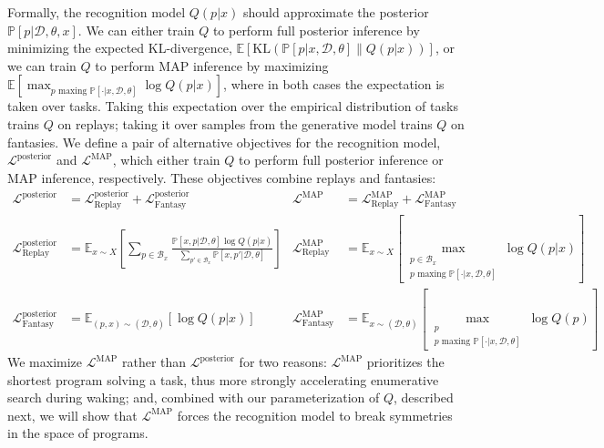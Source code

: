 \documentclass{article}
\newcommand{\expect}{\mathds{E}} %
\newcommand{\probability}{\mathds{P}} %
\begin{document}
Formally, the recognition model $Q(p|x)$ should approximate the posterior
$\probability[p|\mathcal{D},\theta,x]$.
We can either train $Q$ to perform full posterior inference by minimizing the expected KL-divergence, $  \expect\left[\text{KL}\left(\probability[p|x,\mathcal{D},\theta]\|Q(p|x) \right) \right]$,
or we can train $Q$ to perform MAP inference
by maximizing $\expect\left[\max_{p\text{ maxing }\probability[\cdot |x,\mathcal{D},\theta]} \log Q(p|x) \right]$,
where in both cases the expectation is taken over tasks. Taking this expectation over the empirical distribution of tasks trains $Q$ on replays; taking it over samples from the generative model trains $Q$ on fantasies.
We define a pair of alternative objectives for the recognition model,
$\mathcal{L}^{\text{posterior}}$ and $\mathcal{L}^{\text{MAP}}$,
which either train $Q$ to perform full posterior inference or MAP inference, respectively.
These objectives combine replays and fantasies:
\begin{align*}
  \mathcal{L}^{\text{posterior}} &= \mathcal{L}_{\text{Replay}}^{\text{posterior}} + \mathcal{L}_{\text{Fantasy}}^{\text{posterior}}&
  \mathcal{L}^{\text{MAP}} &= \mathcal{L}_{\text{Replay}}^{\text{MAP}} + \mathcal{L}_{\text{Fantasy}}^{\text{MAP}}\\
  \mathcal{L}_{\text{Replay}}^{\text{posterior}}& = \expect_{x\sim X}\left[\sum_{p\in \mathcal{B}_x}
    \frac{\probability\left[x,p|\mathcal{D},\theta \right]\log Q(p|x)}{\sum_{p'\in \mathcal{B}_x}\probability\left[x,p'|\mathcal{D},\theta \right]}\right] &
  \mathcal{L}_{\text{Replay}}^{\text{MAP}}& = \expect_{x\sim X}\left[\max_{\substack{p\in \mathcal{B}_x\\p\text{ maxing }\probability[\cdot |x,\mathcal{D},\theta]}} \log Q(p|x) \right]  \\
  \mathcal{L}_{\text{Fantasy}}^{\text{posterior}} &= \expect_{(p,x)\sim(\mathcal{D},\theta) }\left[\log Q(p|x)\right]&
  \mathcal{L}_{\text{Fantasy}}^{\text{MAP}} &= \expect_{x\sim(\mathcal{D},\theta) }\left[\max_{\substack{p\\p\text{ maxing }\probability[\cdot |x,\mathcal{D},\theta]}}\log Q(p)\right]
\end{align*}
We maximize $\mathcal{L}^{\text{MAP}}$ rather than
$\mathcal{L}^{\text{posterior}}$ for two reasons:
$\mathcal{L}^{\text{MAP}}$ prioritizes the shortest program solving a
task, thus more strongly accelerating enumerative search during waking;
and, combined with our parameterization of $Q$, described next, we
will show that $\mathcal{L}^{\text{MAP}}$ forces the recognition model
to break symmetries in the space of programs.
\end{document}
